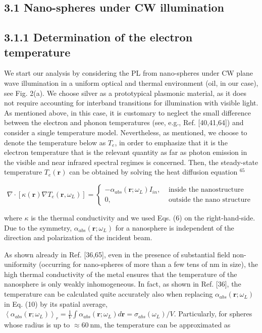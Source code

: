 \documentclass[10pt]{article}
\begin{document}
\subsection*{3.1 Nano-spheres under CW illumination}
\subsection*{3.1.1 Determination of the electron temperature}
We start our analysis by considering the PL from nano-spheres under CW plane wave illumination in a uniform optical and thermal environment (oil, in our case), see Fig. 2(a). We choose silver as a prototypical plasmonic material, as it does not require accounting for interband transitions for illumination with visible light. As mentioned above, in this case, it is customary to neglect the small difference between the electron and phonon temperatures (see, e.g., Ref. [40,41,64]) and consider a single temperature model. Nevertheless, as mentioned, we choose to denote the temperature below as $T_{e}$, in order to emphasize that it is the\\
electron temperature that is the relevant quantity as far as photon emission in the visible and near infrared spectral regimes is concerned. Then, the steady-state temperature $T_{e}(\mathbf{r})$ can be obtained by solving the heat diffusion equation ${ }^{65}$

\[
\nabla \cdot\left[\kappa(\mathbf{r}) \nabla T_{e}\left(\mathbf{r}, \omega_{L}\right)\right]= \begin{cases}-\alpha_{a b s}\left(\mathbf{r} ; \omega_{L}\right) I_{i n}, & \text { inside the nanostructure }  \tag{10}\\ 0, & \text { outside the nano structure }\end{cases}
\]

where $\kappa$ is the thermal conductivity and we used Eqs. (6) on the right-hand-side. Due to the symmetry, $\alpha_{a b s}\left(\mathbf{r} ; \omega_{L}\right)$ for a nanosphere is independent of the direction and polarization of the incident beam.

As shown already in Ref. [36,65], even in the presence of substantial field non-uniformity (occurring for nano-spheres of more than a few tens of nm in size), the high thermal conductivity of the metal ensures that the temperature of the nanosphere is only weakly inhomogeneous. In fact, as shown in Ref. [36], the temperature can be calculated quite accurately also when replacing $\alpha_{a b s}\left(\mathbf{r} ; \omega_{L}\right)$ in Eq. (10) by its spatial average, $\left\langle\alpha_{a b s}\left(\mathbf{r} ; \omega_{L}\right)\right\rangle_{r}= \frac{1}{V} \int \alpha_{a b s}\left(\mathbf{r} ; \omega_{L}\right) d \mathbf{r}=\sigma_{a b s}\left(\omega_{L}\right) / V$. Particularly, for spheres whose radius is up to $\approx 60 \mathrm{~nm}$, the temperature can be approximated as
\end{document}
